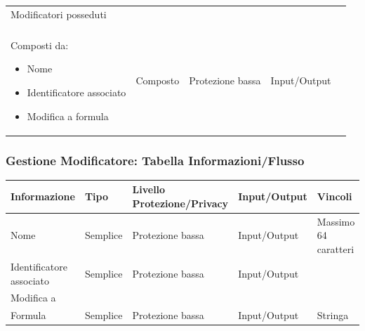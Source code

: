 \documentclass[a4paper, 11pt]{article}
\let\newline\\
\begin{document}
\begin{center}
\begin{longtable}{|p{4cm}|p{1.5cm}|p{3cm}|p{2.5cm}|p{4cm}|}
        \hline
        Modificatori posseduti \newline \newline Composti da: 
        \begin{itemize}
            \item Nome
            \item Identificatore associato 
            \item Modifica a formula
        \end{itemize} & Composto & Protezione bassa & Input/Output & \\
        \hline
    \end{longtable}
\end{center}


\vspace{2em}

\subsubsection*{Gestione Modificatore: Tabella Informazioni/Flusso}
\begin{adjustwidth}{-1.5cm}{-1.5cm}
\begin{center}
    \begin{tabular}{|p{3cm}|p{1.5cm}|p{3.5cm}|p{2.5cm}|p{4cm}|}
        \hline
        \textbf{Informazione} & \textbf{Tipo} & \textbf{Livello \newline Protezione/Privacy} & \textbf{Input/Output}&\textbf{Vincoli}\\
        \hline
        Nome & Semplice & Protezione bassa & Input/Output & Massimo 64 caratteri \\\hline
        Identificatore associato & Semplice & Protezione bassa & Input/Output & \\\hline
        Modifica a \newline Formula & Semplice & Protezione bassa & Input/Output & Stringa \\\hline
    \end{tabular}
\end{center}
\end{adjustwidth}
        
\vspace{2em}

\newpage
\end{document}
